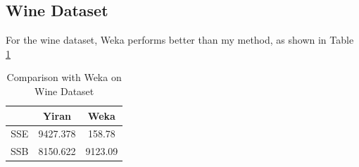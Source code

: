 \documentclass{article}
\begin{document}
	\subsection{Wine Dataset}
		For the wine dataset, Weka performs better than my method, as shown in Table \ref{tbl:off-shelf-wine}

		\begin{table}[H]
		\centering
			\begin{tabular}{|c|c|c|}
				\hline
				& Yiran & Weka \\
				\hline
				SSE & 9427.378 & 158.78 \\
				\hline
				SSB & 8150.622 & 9123.09 \\
				\hline
			\end{tabular}
			\caption{Comparison with Weka on Wine Dataset}
			\label{tbl:off-shelf-wine}
		\end{table}
\end{document}

